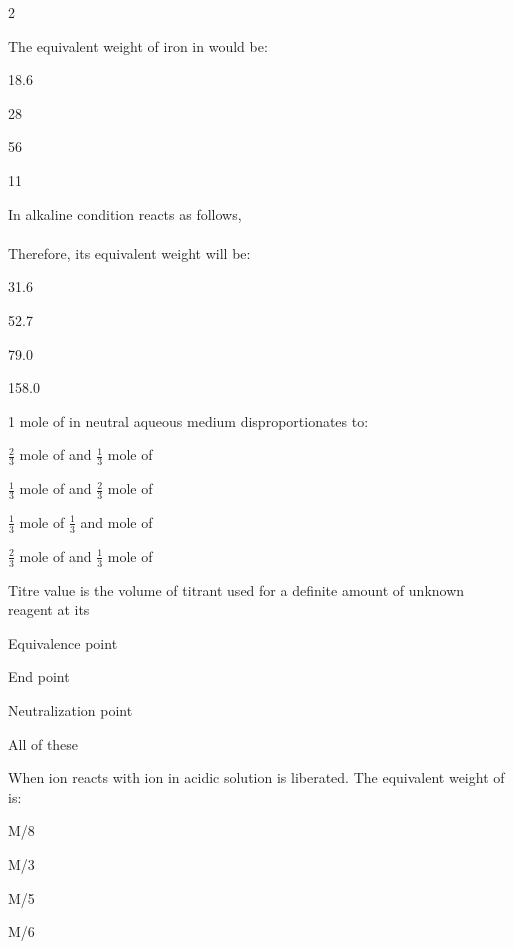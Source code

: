 \documentclass[10pt,a4paper]{article}
\begin{document}
\begin{multicols}{2}
\begin{questions}[start=119]
\item The equivalent weight of iron in  would be:
\begin{options}
  \item 18.6
  \item 28
  \item 56
  \item 11
\end{options}

\item In alkaline condition  reacts as follows,\\
\\
Therefore, its equivalent weight will be:
\begin{options}
  \item 31.6
  \item 52.7
  \item 79.0
  \item 158.0
\end{options}

\item 1 mole of  in neutral aqueous medium disproportionates to:
\begin{options}
  \item $\frac{2}{3}$ mole of  and $\frac{1}{3}$ mole of 
  \item $\frac{1}{3}$ mole of  and $\frac{2}{3}$ mole of 
  \item $\frac{1}{3}$ mole of $\frac{1}{3}$ and mole of 
  \item $\frac{2}{3}$ mole of  and $\frac{1}{3}$ mole of 
\end{options}

\item Titre value is the volume of titrant used for a definite amount of unknown reagent at its
\begin{options}
  \item Equivalence point
  \item End point
  \item Neutralization point
  \item All of these
\end{options}

\item When  ion reacts with  ion in acidic solution  is liberated. The equivalent weight of  is:
\begin{options}
  \item M/8
  \item M/3
  \item M/5
  \item M/6
\end{options}


\end{questions}
\end{multicols}
\end{document}
